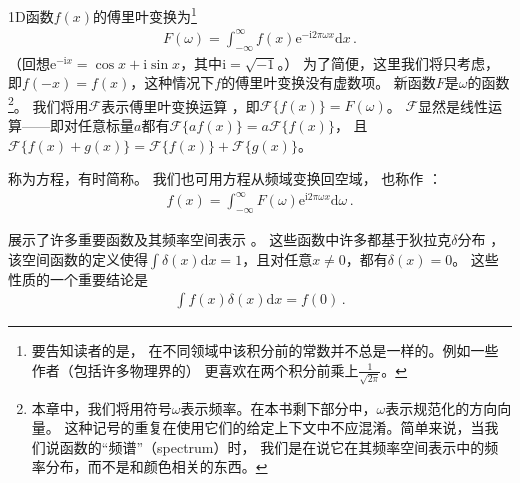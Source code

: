 1D函数$f(x)$的傅里叶变换为\footnote{要告知读者的是，
    在不同领域中该积分前的常数并不总是一样的。例如一些作者（包括许多物理界的）
    更喜欢在两个积分前乘上$\frac{1}{\sqrt{2\pi}}$。}
\begin{align}\label{eq:7.1}
    F(\omega)=\int_{-\infty}^{\infty}f(x)\mathrm{e}^{-\mathrm{i}2\pi\omega x}\mathrm{d}x\, .
\end{align}
（回想$\mathrm{e}^{-\mathrm{i}x}=\cos x+\mathrm{i}\sin x$，其中$\mathrm{i}=\sqrt{-1}$。）
为了简便，这里我们将只考虑，
即$f(-x)=f(x)$，这种情况下$f$的傅里叶变换没有虚数项。
新函数$F$是$\omega$的函数
\footnote{本章中，我们将用符号$\omega$表示频率。在本书剩下部分中，$\omega$表示规范化的方向向量。
    这种记号的重复在使用它们的给定上下文中不应混淆。简单来说，当我们说函数的“频谱”（spectrum）时，
    我们是在说它在其频率空间表示中的频率分布，而不是和颜色相关的东西。}。
我们将用$\mathcal{F}$表示傅里叶变换运算
，即$\mathcal{F}\{f(x)\}=F(\omega)$。
$\mathcal{F}$显然是线性运算——即对任意标量$a$都有$\mathcal{F}\{af(x)\}=a\mathcal{F}\{f(x)\}$，
且$\mathcal{F}\{f(x)+g(x)\}=\mathcal{F}\{f(x)\}+\mathcal{F}\{g(x)\}$。

称为方程，有时简称。
我们也可用方程从频域变换回空域，
也称作
：
\begin{align}\label{eq:7.2}
    f(x)=\int_{-\infty}^{\infty}F(\omega)\mathrm{e}^{\mathrm{i}2\pi\omega x}\mathrm{d}\omega\, .
\end{align}

展示了许多重要函数及其频率空间表示
。
这些函数中许多都基于狄拉克$\delta$分布
，
该空间函数的定义使得$\displaystyle\int\delta(x)\mathrm{d}x=1$，且对任意$x\neq0$，都有$\delta(x)=0$。
这些性质的一个重要结论是
\begin{align*}
    \int f(x)\delta(x)\mathrm{d}x=f(0)\, .
\end{align*}

